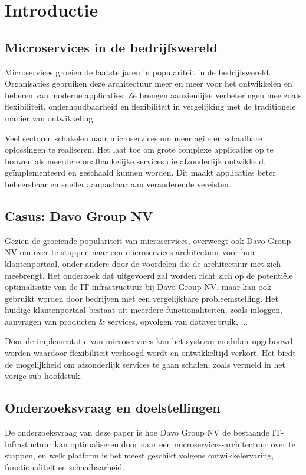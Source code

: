 
\section{Introductie}%
\label{sec:introductie}
\subsection{Microservices in de bedrijfswereld}
Microservices groeien de laatste jaren in populariteit in de bedrijfswereld. Organisaties gebruiken deze architectuur meer en meer voor het ontwikkelen en beheren van moderne applicaties. Ze brengen aanzienlijke verbeteringen mee zoals flexibiliteit, onderhoudbaarheid en flexibiliteit in vergelijking met de traditionele manier van ontwikkeling.

Veel sectoren schakelen naar microservices om meer agile en schaalbare oplossingen te realiseren. Het laat toe om grote complexe applicaties op te bouwen als meerdere onafhankelijke services die afzonderlijk ontwikkeld, geïmplementeerd en geschaald kunnen worden. Dit maakt applicaties beter beheersbaar en sneller aanpasbaar aan veranderende vereisten.

\subsection{Casus: Davo Group NV}
Gezien de groeiende populariteit van microservices, overweegt ook Davo Group NV om over te stappen naar een microservices-architectuur voor hun klantenportaal, onder andere door de voordelen die de architectuur met zich meebrengt. Het onderzoek dat uitgevoerd zal worden richt zich op de potentiële optimalisatie van de IT-infrastructuur bij Davo Group NV, maar kan ook gebruikt worden door bedrijven met een vergelijkbare probleemstelling. Het huidige klantenportaal bestaat uit meerdere functionaliteiten, zoals inloggen, aanvragen van producten \& services, opvolgen van dataverbruik, ...

Door de implementatie van microservices kan het systeem modulair opgebouwd worden waardoor flexibiliteit verhoogd wordt en ontwikkeltijd verkort. Het biedt de mogelijkheid om afzonderlijk services te gaan schalen, zoals vermeld in het vorige sub-hoofdstuk.

\subsection{Onderzoeksvraag en doelstellingen}
De onderzoeksvraag van deze paper is hoe Davo Group NV de bestaande IT-infrastuctuur kan optimaliseren door naar een microservices-architectuur over te stappen, en welk platform is het meest geschikt volgens ontwikkelervaring, functionaliteit en schaalbaarheid.

